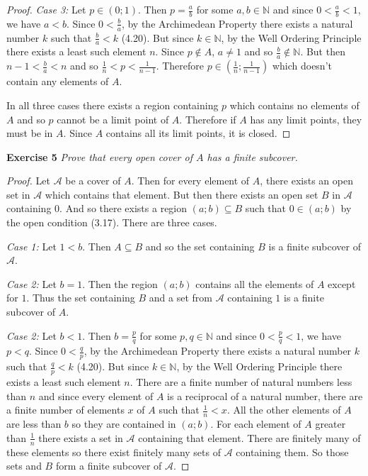 \documentclass{article}
\begin{document}
\begin{flushleft}
\begin{proof}
\textit{Case 3:} Let $p \in (0;1)$. Then $p=\frac{a}{b}$ for some $a,b \in \mathbb{N}$ and since $0 < \frac{a}{b} < 1$, we have $a<b$. Since $0<\frac{b}{a}$, by the Archimedean Property there exists a natural number $k$ such that $\frac{b}{a} < k$ (4.20). But since $k \in \mathbb{N}$, by the Well Ordering Principle there exists a least such element $n$. Since $p \notin A$, $a \neq 1$ and so $\frac{b}{a} \notin \mathbb{N}$. But then $n-1 < \frac{b}{a} < n$ and so $\frac{1}{n}<p<\frac{1}{n-1}$. Therefore $p \in \left( \frac{1}{n};\frac{1}{n-1} \right)$ which doesn't contain any elements of $A$.\newline

In all three cases there exists a region containing $p$ which contains no elements of $A$ and so $p$ cannot be a limit point of $A$. Therefore if $A$ has any limit points, they must be in $A$. Since $A$ contains all its limit points, it is closed.
\end{proof}

\textbf{Exercise 5}
\textsl{Prove that every open cover of $A$ has a finite subcover.}
\begin{proof}
Let $\mathcal{A}$ be a cover of $A$. Then for every element of $A$, there exists an open set in $\mathcal{A}$ which contains that element. But then there exists an open set $B$ in $\mathcal{A}$ containing $0$. And so there exists a region $(a;b) \subseteq B$ such that $0 \in (a;b)$ by the open condition (3.17). There are three cases.\newline

\textit{Case 1:} Let $1 < b$. Then $A \subseteq B$ and so the set containing $B$ is a finite subcover of $\mathcal{A}$.\newline

\textit{Case 2:} Let $b=1$. Then the region $(a;b)$ contains all the elements of $A$ except for $1$. Thus the set containing $B$ and a set from $\mathcal{A}$ containing $1$ is a finite subcover of $A$.\newline

\textit{Case 2:} Let $b < 1$. Then $b=\frac{p}{q}$ for some $p,q \in \mathbb{N}$ and since $0 < \frac{p}{q} < 1$, we have $p<q$. Since $0<\frac{q}{p}$, by the Archimedean Property there exists a natural number $k$ such that $\frac{q}{p} < k$ (4.20). But since $k \in \mathbb{N}$, by the Well Ordering Principle there exists a least such element $n$. There are a finite number of natural numbers less than $n$ and since every element of $A$ is a reciprocal of a natural number, there are a finite number of elements $x$ of $A$ such that $\frac{1}{n} < x$. All the other elements of $A$ are less than $b$ so they are contained in $(a;b)$. For each element of $A$ greater than $\frac{1}{n}$ there exists a set in $\mathcal{A}$ containing that element. There are finitely many of these elements so there exist finitely many sets of $\mathcal{A}$ containing them. So those sets and $B$ form a finite subcover of $\mathcal{A}$.
\end{proof}


\end{flushleft}
\end{document}
